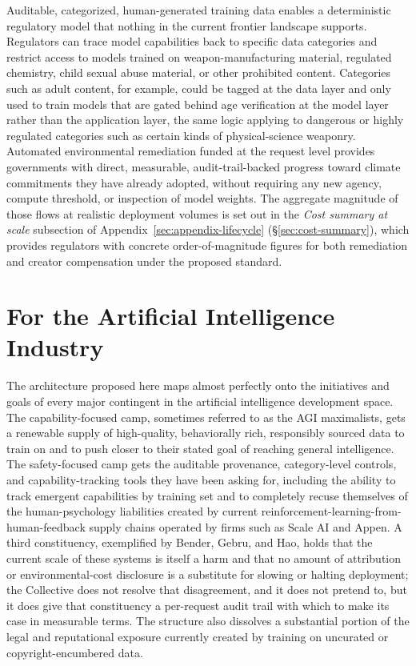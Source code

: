 \documentclass[10pt,a4paper,twocolumn]{article}
\begin{document}
Auditable, categorized, human-generated training data enables a deterministic regulatory model that nothing in the current frontier landscape supports. Regulators can trace model capabilities back to specific data categories and restrict access to models trained on weapon-manufacturing material, regulated chemistry, child sexual abuse material, or other prohibited content. Categories such as adult content, for example, could be tagged at the data layer and only used to train models that are gated behind age verification at the model layer rather than the application layer, the same logic applying to dangerous or highly regulated categories such as certain kinds of physical-science weaponry. Automated environmental remediation funded at the request level provides governments with direct, measurable, audit-trail-backed progress toward climate commitments they have already adopted, without requiring any new agency, compute threshold, or inspection of model weights. The aggregate magnitude of those flows at realistic deployment volumes is set out in the \emph{Cost summary at scale} subsection of Appendix~\ref{sec:appendix-lifecycle} (\S\ref{sec:cost-summary}), which provides regulators with concrete order-of-magnitude figures for both remediation and creator compensation under the proposed standard.

\section{For the Artificial Intelligence Industry}
\label{sec:why-ai}

The architecture proposed here maps almost perfectly onto the initiatives and goals of every major contingent in the artificial intelligence development space. The capability-focused camp, sometimes referred to as the AGI maximalists, gets a renewable supply of high-quality, behaviorally rich, responsibly sourced data to train on and to push closer to their stated goal of reaching general intelligence. The safety-focused camp gets the auditable provenance, category-level controls, and capability-tracking tools they have been asking for, including the ability to track emergent capabilities by training set and to completely recuse themselves of the human-psychology liabilities created by current reinforcement-learning-from-human-feedback supply chains operated by firms such as Scale AI and Appen. A third constituency, exemplified by Bender, Gebru, and Hao, holds that the current scale of these systems is itself a harm and that no amount of attribution or environmental-cost disclosure is a substitute for slowing or halting deployment; the Collective does not resolve that disagreement, and it does not pretend to, but it does give that constituency a per-request audit trail with which to make its case in measurable terms. The structure also dissolves a substantial portion of the legal and reputational exposure currently created by training on uncurated or copyright-encumbered data.
\end{document}
